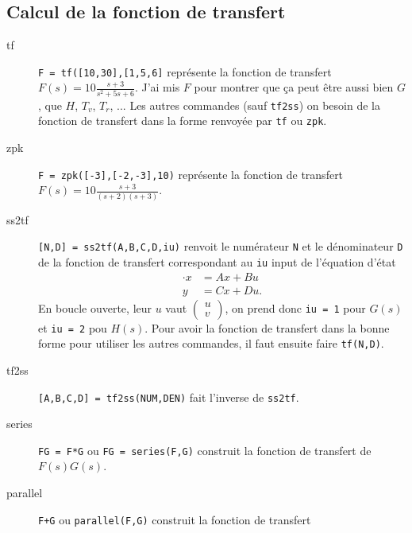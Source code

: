\subsection{Calcul de la fonction de transfert}
\begin{description}
  \item[tf] \lstinline|F = tf([10,30],[1,5,6]| représente la fonction de transfert $F(s)=10\frac{s+3}{s^2+5s+6}$.
    J'ai mis $F$ pour montrer que ça peut être aussi bien $G$, que $H$, $T_v$, $T_r$, ...
    Les autres commandes (sauf \lstinline|tf2ss|) on besoin de la fonction de transfert
    dans la forme renvoyée par \lstinline|tf| ou \lstinline|zpk|.
  \item[zpk] \lstinline|F = zpk([-3],[-2,-3],10)| représente la fonction de transfert $F(s) = 10\frac{s+3}{(s+2)(s+3)}$.
  \item[ss2tf] \lstinline|[N,D] = ss2tf(A,B,C,D,iu)| renvoit le numérateur \lstinline|N| et le dénominateur \lstinline|D|
    de la fonction de transfert correspondant au \lstinline|iu|\ieme{} input de l'équation d'état
    \begin{align*}
      \cdot{x} & = Ax + Bu\\
      y & = Cx + Du.
    \end{align*}
    En boucle ouverte, leur $u$ vaut
    $\begin{pmatrix}
      u\\v
    \end{pmatrix}$,
    on prend donc \lstinline|iu = 1| pour $G(s)$
    et \lstinline|iu = 2| pou $H(s)$.
    Pour avoir la fonction de transfert dans la bonne
    forme pour utiliser les autres commandes, il faut ensuite faire
    \lstinline|tf(N,D)|.
  \item[tf2ss] \lstinline|[A,B,C,D] = tf2ss(NUM,DEN)| fait l'inverse de \lstinline|ss2tf|.
  \item[series] \lstinline|FG = F*G| ou \lstinline|FG = series(F,G)| construit la fonction de transfert
    de $F(s)G(s)$.
    \begin{center}
    \end{center}
  \item[parallel] \lstinline|F+G| ou \lstinline|parallel(F,G)| construit la fonction de transfert

\end{description}
